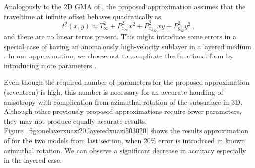 Analogously to the 2D GMA of \cite{fomelstovas}, the proposed approximation assumes that the traveltime at infinite offset behaves quadratically as 
\begin{equation}
    t^2(x,y) \approx T^2_\infty + P^2_{x_\infty} x^2 + P^2_{{xy}_\infty} xy + P^2_{y_\infty} y^2~,
\end{equation}
and there are no linear terms present. This might introduce some errors in a special case of having an anomalously high-velocity sublayer in a layered medium \cite[]{blias2013,ravvekoren}. In our approximation, we choose not to complicate the functional form by introducing more parameters .


Even though the required number of parameters for the proposed approximation (seventeen) is high, this number is necessary for an accurate handling of anisotropy with complication from  azimuthal rotation of the subsurface in 3D. Although other previously proposed approximations require fewer parameters, they may not produce equally accurate results. Figure~\ref{fig:onelayerxuazi20,layeredxuazi503020} shows the results approximation of \cite{xu} for the two models from last section, when 20\% error is introduced in known azimuthal rotation. We can observe a significant decrease in accuracy especially in the layered case. 


